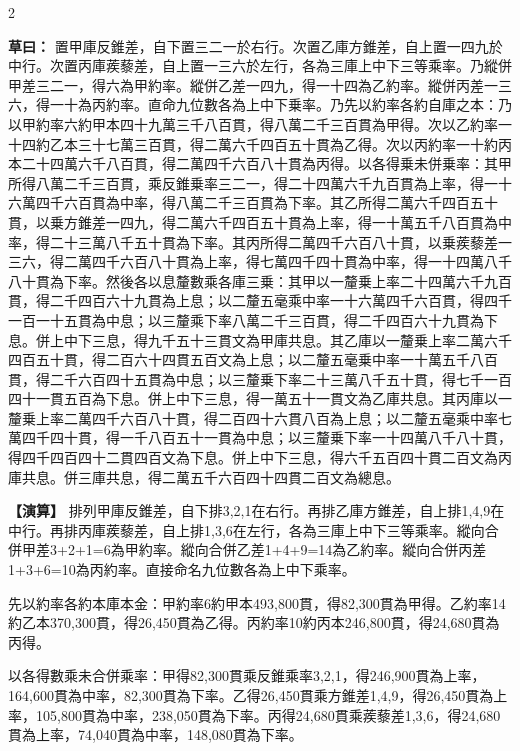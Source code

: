 \documentclass[11pt,a4paper]{article}
\newcommand{\ClassicalWorking}[1]{\par\noindent\textbf{草曰：}#1\par}
\newcommand{\ModernWorking}[1]{\par\noindent\textbf{【演算】}#1\par}
\begin{document}
\begin{paracol}{2}

\ClassicalWorking{%
置甲庫反錐差，自下置三二一於右行。次置乙庫方錐差，自上置一四九於中行。次置丙庫蒺藜差，自上置一三六於左行，各為三庫上中下三等乘率。乃縱併甲差三二一，得六為甲約率。縱併乙差一四九，得一十四為乙約率。縱併丙差一三六，得一十為丙約率。直命九位數各為上中下乗率。乃先以約率各約自庫之本：乃以甲約率六約甲本四十九萬三千八百貫，得八萬二千三百貫為甲得。次以乙約率一十四約乙本三十七萬三百貫，得二萬六千四百五十貫為乙得。次以丙約率一十約丙本二十四萬六千八百貫，得二萬四千六百八十貫為丙得。以各得乗未併乗率：其甲所得八萬二千三百貫，乘反錐乗率三二一，得二十四萬六千九百貫為上率，得一十六萬四千六百貫為中率，得八萬二千三百貫為下率。其乙所得二萬六千四百五十貫，以乗方錐差一四九，得二萬六千四百五十貫為上率，得一十萬五千八百貫為中率，得二十三萬八千五十貫為下率。其丙所得二萬四千六百八十貫，以乗蒺藜差一三六，得二萬四千六百八十貫為上率，得七萬四千四十貫為中率，得一十四萬八千八十貫為下率。然後各以息釐數乘各庫三乗：其甲以一釐乗上率二十四萬六千九百貫，得二千四百六十九貫為上息；以二釐五毫乘中率一十六萬四千六百貫，得四千一百一十五貫為中息；以三釐乘下率八萬二千三百貫，得二千四百六十九貫為下息。併上中下三息，得九千五十三貫文為甲庫共息。其乙庫以一釐乗上率二萬六千四百五十貫，得二百六十四貫五百文為上息；以二釐五毫乗中率一十萬五千八百貫，得二千六百四十五貫為中息；以三釐乗下率二十三萬八千五十貫，得七千一百四十一貫五百為下息。併上中下三息，得一萬五十一貫文為乙庫共息。其丙庫以一釐乗上率二萬四千六百八十貫，得二百四十六貫八百為上息；以二釐五毫乘中率七萬四千四十貫，得一千八百五十一貫為中息；以三釐乗下率一十四萬八千八十貫，得四千四百四十二貫四百文為下息。併上中下三息，得六千五百四十貫二百文為丙庫共息。併三庫共息，得二萬五千六百四十四貫二百文為總息。}

\switchcolumn

\ModernWorking{%
排列甲庫反錐差，自下排3,2,1在右行。再排乙庫方錐差，自上排1,4,9在中行。再排丙庫蒺藜差，自上排1,3,6在左行，各為三庫上中下三等乘率。縱向合併甲差3+2+1=6為甲約率。縱向合併乙差1+4+9=14為乙約率。縱向合併丙差1+3+6=10為丙約率。直接命名九位數各為上中下乘率。

先以約率各約本庫本金：甲約率6約甲本493,800貫，得82,300貫為甲得。乙約率14約乙本370,300貫，得26,450貫為乙得。丙約率10約丙本246,800貫，得24,680貫為丙得。

以各得數乘未合併乘率：甲得82,300貫乘反錐乘率3,2,1，得246,900貫為上率，164,600貫為中率，82,300貫為下率。乙得26,450貫乘方錐差1,4,9，得26,450貫為上率，105,800貫為中率，238,050貫為下率。丙得24,680貫乘蒺藜差1,3,6，得24,680貫為上率，74,040貫為中率，148,080貫為下率。

}
\end{paracol}
\end{document}
